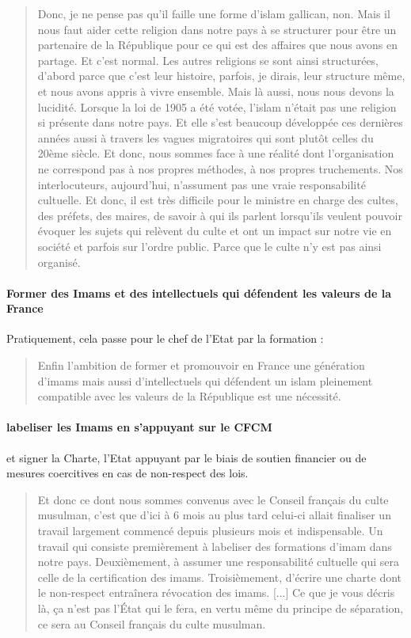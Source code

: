 \begin{quote}
Donc, je ne pense pas qu'il faille une forme d'islam gallican, non. Mais il nous faut aider cette religion dans notre pays à se structurer pour être un partenaire de la République pour ce qui est des affaires que nous avons en partage. Et c'est normal. Les autres religions se sont ainsi structurées, d'abord parce que c'est leur histoire, parfois, je dirais, leur structure même, et nous avons appris à vivre ensemble. Mais là aussi, nous nous devons la lucidité.
Lorsque la loi de 1905 a été votée, l’islam n’était pas une religion si présente dans notre pays. Et elle s’est beaucoup développée ces dernières années aussi à travers les vagues migratoires qui sont plutôt celles du 20ème siècle. {Et donc, nous sommes face à une réalité dont l’organisation ne correspond pas à nos propres méthodes, à nos propres truchements. Nos interlocuteurs, aujourd’hui, n’assument pas une vraie responsabilité cultuelle. Et donc, il est très difficile pour le ministre en charge des cultes, des préfets, des maires, de savoir à qui ils parlent lorsqu’ils veulent pouvoir évoquer les sujets qui relèvent du culte et ont un impact sur notre vie en société et parfois sur l'ordre public. Parce que le culte n'y est pas ainsi organisé.}

    
\end{quote}

\paragraph{Former des Imams et des intellectuels qui défendent les valeurs de la France}
Pratiquement, cela passe pour le chef de l'Etat par la formation : 

\begin{quote}

Enfin l’ambition de former et promouvoir en France une génération d’imams mais aussi d’intellectuels qui défendent un islam pleinement compatible avec les valeurs de la République est une nécessité. 
\end{quote}

\paragraph{labeliser les Imams en s'appuyant sur le CFCM} et signer la Charte, l'Etat appuyant par le biais de soutien financier ou de  mesures coercitives en cas de non-respect des lois.
\begin{quote}
Et donc ce dont nous sommes convenus avec le Conseil français du culte musulman, c’est que d’ici à 6 mois au plus tard celui-ci allait finaliser un travail largement commencé depuis plusieurs mois et indispensable. Un travail qui consiste premièrement à labeliser des formations d’imam dans notre pays. Deuxièmement, à assumer une responsabilité cultuelle qui sera celle de la certification des imams. Troisièmement, d’écrire une charte dont le non-respect entraînera révocation des imams. [...]
Ce que je vous décris là, ça n’est pas l’État qui le fera, en vertu même du principe de séparation, ce sera au Conseil français du culte musulman. 
\end{quote}


